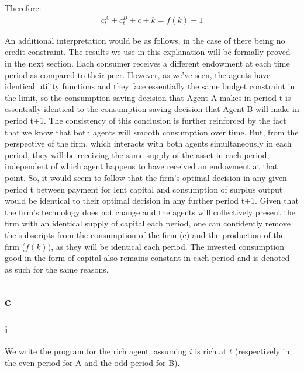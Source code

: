 \documentclass{article}
\begin{document}
Therefore:
\begin{gather*}
    c_t^A+c_t^B+c+k=f(k)+1
\end{gather*}


\color{black}
An additional interpretation would be as follows, in the case of there being no credit constraint. The results we use in this explanation will be formally proved in the next section. Each consumer receives a different endowment at each time period as compared to their peer. However, as we've seen, the agents have identical utility functions and they face essentially the same budget constraint in the limit, so the consumption-saving decision that Agent A makes in period t is essentially identical to the consumption-saving decision that Agent B will make in period t+1. The consistency of this conclusion is further reinforced by the fact that we know that both agents will smooth consumption over time. But, from the perspective of the firm, which interacts with both agents simultaneously in each period, they will be receiving the same supply of the asset in each period, independent of which agent happens to have received an endowment at that point. So, it would seem to follow that the firm's optimal decision in any given period t between payment for lent capital and consumption of surplus output would be identical to their optimal decision in any further period t+1. Given that the firm's technology does not change and the agents will collectively present the firm with an identical supply of capital each period, one can confidently remove the subscripts from the consumption of the firm (c) and the production of the firm ($f(k)$), as they will be identical each period. The invested consumption good in the form of capital also remains constant in each period and is denoted as such for the same reasons.



\subsection{c}

\subsubsection{i}
We write the program for the rich agent, assuming $i$ is rich at $t$ (respectively in the even period for A and the odd period for B).\\
\end{document}
